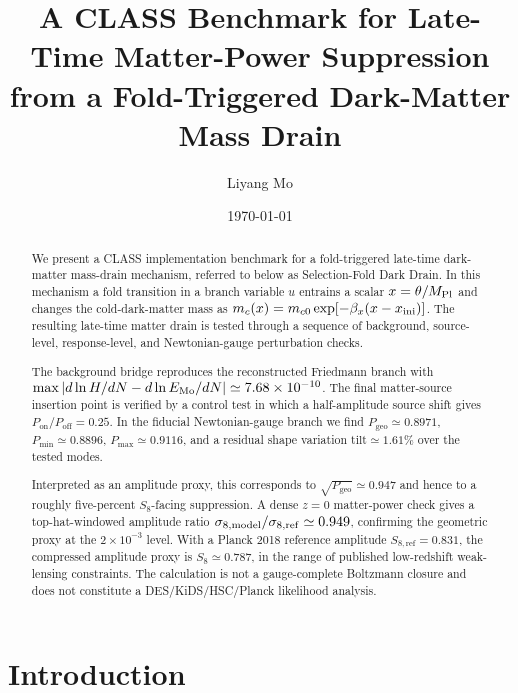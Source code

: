 ﻿\documentclass[11pt,prd,preprint,nofootinbib,amsmath,amssymb]{revtex4-2}
\begin{document}
\title{A CLASS Benchmark for Late-Time Matter-Power Suppression from a Fold-Triggered Dark-Matter Mass Drain}

\author{Liyang Mo}

\date{\today}

\begin{abstract}
We present a CLASS implementation benchmark for a fold-triggered late-time
dark-matter mass-drain mechanism, referred to below as Selection-Fold Dark
Drain. In this mechanism a fold transition in a branch variable $u$ entrains a
scalar $x=\theta/M_{\rm Pl}$ and changes the cold-dark-matter mass as
$m_c(x)=m_{c0}\exp[-\beta_x(x-x_{\rm ini})]$. The resulting late-time matter
drain is tested through a sequence of background, source-level, response-level,
and Newtonian-gauge perturbation checks.

The background bridge reproduces the reconstructed Friedmann branch with
$\max|d\ln H/dN-d\ln E_{\rm Mo}/dN|\simeq7.68\times10^{-10}$. The final
matter-source insertion point is verified by a control test in which a
half-amplitude source shift gives $P_{\mathrm{on}}/P_{\mathrm{off}}=0.25$. In the
fiducial Newtonian-gauge branch we find
$P_{\mathrm{geo}}\simeq0.8971$, $P_{\min}\simeq0.8896$,
$P_{\max}\simeq0.9116$, and a residual shape variation
$\mathrm{tilt}\simeq1.61\%$ over the tested modes.

Interpreted as an amplitude proxy, this corresponds to
$\sqrt{P_{\mathrm{geo}}}\simeq0.947$ and hence to a roughly five-percent
$S_8$-facing suppression. A dense $z=0$ matter-power check gives a
top-hat-windowed amplitude ratio
$\sigma_{8,\rm model}/\sigma_{8,\rm ref}\simeq0.949$, confirming the
geometric proxy at the $2\times10^{-3}$ level. With a Planck 2018 reference amplitude
$S_{8,\mathrm{ref}}=0.831$, the compressed amplitude proxy is
$S_8\simeq0.787$, in the range of published low-redshift weak-lensing
constraints. The calculation is not a gauge-complete Boltzmann closure and
does not constitute a DES/KiDS/HSC/Planck likelihood analysis.
\end{abstract}

\maketitle

\section{Introduction}
\end{document}
